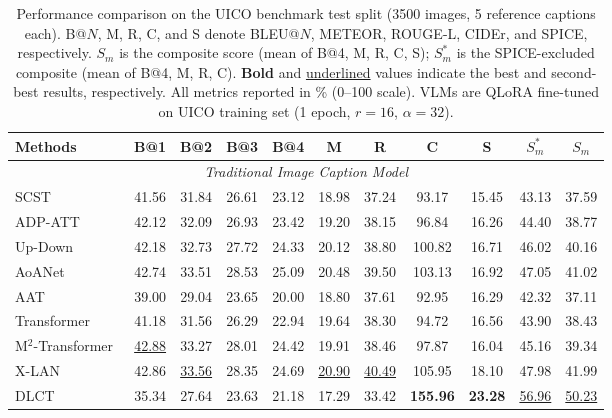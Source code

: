 \documentclass[lettersize,journal]{IEEEtran}
\begin{document}
	\begin{table}[t]\normalsize
		\centering
		\captionsetup{justification=justified}
		\caption{Performance comparison on the UICO benchmark test split (3500 images, 5 reference captions each). B@$N$, M, R, C, and S denote BLEU@$N$, METEOR, ROUGE-L, CIDEr, and SPICE, respectively. $S_m$ is the composite score (mean of B@4, M, R, C, S); $S^*_m$ is the SPICE-excluded composite (mean of B@4, M, R, C). \textbf{Bold} and \underline{underlined} values indicate the best and second-best results, respectively. All metrics reported in \% (0--100 scale). VLMs are QLoRA fine-tuned on UICO training set (1 epoch, $r{=}16$, $\alpha{=}32$).}
		\label{tab:results}
		\begin{tabular*}{\textwidth}{@{\extracolsep{\fill}} l c c c c c c c c c c}
			\toprule
			Methods & B@1  & B@2  & B@3  & B@4  & M    & R    & C     & S    & $S^*_m$ & $S_m$ \\
			\midrule
			\multicolumn{11}{c}{\textit{Traditional Image Caption Model}} \\
			\midrule
			SCST~\cite{rennie2017self}                  & 41.56 & 31.84 & 26.61 & 23.12 & 18.98 & 37.24 &  93.17 & 15.45 & 43.13 & 37.59 \\
			ADP-ATT~\cite{lu2017knowing}                & 42.12 & 32.09 & 26.93 & 23.42 & 19.20 & 38.15 &  96.84 & 16.26 & 44.40 & 38.77 \\
			Up-Down~\cite{anderson2018bottom}           & 42.18 & 32.73 & 27.72 & 24.33 & 20.12 & 38.80 & 100.82 & 16.71 & 46.02 & 40.16 \\
			AoANet~\cite{huang2019attention}            & 42.74 & 33.51 & 28.53 & 25.09 & 20.48 & 39.50 & 103.13 & 16.92 & 47.05 & 41.02 \\
			AAT~\cite{huang2019adaptively}              & 39.00 & 29.04 & 23.65 & 20.00 & 18.80 & 37.61 &  92.95 & 16.29 & 42.32 & 37.11 \\
			Transformer~\cite{vaswani2017attention}     & 41.18 & 31.56 & 26.29 & 22.94 & 19.64 & 38.30 &  94.72 & 16.56 & 43.90 & 38.43 \\
			M$^{2}$-Transformer~\cite{cornia2020meshed} & \underline{42.88} & 33.27 & 28.01 & 24.42 & 19.91 & 38.46 &  97.87 & 16.04 & 45.16 & 39.34 \\
			X-LAN~\cite{pan2020x}                       & 42.86 & \underline{33.56} & 28.35 & 24.69 & \underline{20.90} & \underline{40.49} & 105.95 & 18.10 & 47.98 & 41.99 \\
			DLCT~\cite{luo2021dual}                     & 35.34 & 27.64 & 23.63 & 21.18 & 17.29 & 33.42 & \textbf{155.96} & \textbf{23.28} & \underline{56.96} & \underline{50.23} \\

\end{tabular*}
\end{table}
\end{document}
